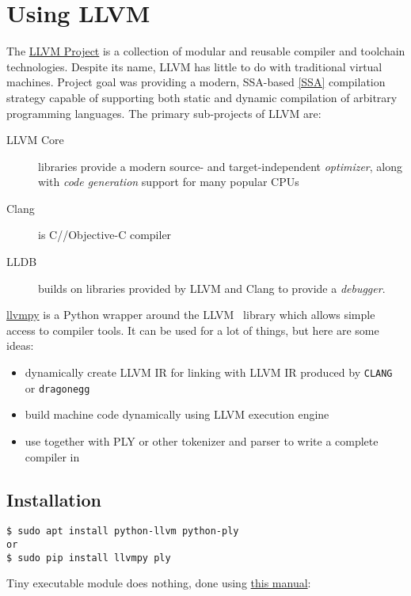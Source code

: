 \chapter{Using LLVM}\clearpage

The \href{http://llvm.org/}{LLVM Project} is a
collection of modular and reusable compiler and toolchain technologies. Despite
its name, LLVM has little to do with traditional virtual machines. Project goal
was providing a modern, SSA-based \ref{SSA}
compilation strategy capable of supporting both static and dynamic compilation
of arbitrary programming languages. The primary sub-projects of LLVM are:
\begin{description}
\item[LLVM Core] libraries provide a modern source- and target-independent
\emph{optimizer}, along with \emph{code generation} support for many popular
CPUs
\item[Clang] is C/\cpp/Objective-C compiler
\item[LLDB] builds on libraries provided by LLVM and Clang to provide a
\emph{debugger}.
\end{description}

\bigskip
\href{http://www.llvmpy.org/}{llvmpy} is a Python wrapper around the LLVM \cpp\
library which allows simple access to compiler tools.
It can be used for a lot of things, but here are some ideas:
\begin{itemize}[nosep]
  \item 
dynamically create LLVM IR for linking with LLVM IR produced by \verb|CLANG| or
\verb|dragonegg|
  \item 
build machine code dynamically using LLVM execution engine
  \item 
use together with PLY or other tokenizer and parser to write a complete compiler
in \py
\end{itemize}

\section{Installation}

\begin{verbatim}
$ sudo apt install python-llvm python-ply
or
$ sudo pip install llvmpy ply
\end{verbatim}


Tiny executable module does nothing, done using
\href{https://eli.thegreenplace.net/2012/08/10/building-and-using-llvmpy-a-basic-example}{this manual}:



